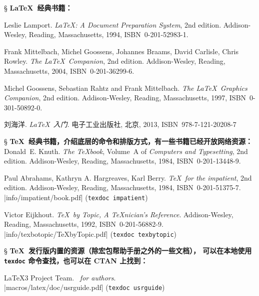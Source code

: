 \begin{thebibliography}{20}

\item[\S] {\bfseries \LaTeX\ 经典书籍：}

 Leslie Lamport. 
  \newblock \emph{\LaTeX: A Document Preparation System}, 2nd edition.
  \newblock Addison-Wesley, Reading, Massachusetts, 1994, ISBN~0-201-52983-1.

 Frank Mittelbach, Michel Goossens, Johannes Braams, David Carlisle, Chris Rowley. 
  \newblock \emph{The \LaTeX\ Companion}, 2nd edition.
  \newblock Addison-Wesley, Reading, Massachusetts, 2004, ISBN~0-201-36299-6.

 Michel Goossens, Sebastian Rahtz and Frank Mittelbach. 
  \newblock \emph{The \LaTeX\ Graphics Companion}, 2nd edition.
  \newblock Addison-Wesley, Reading, Massachusetts, 1997, ISBN~0-301-50892-0.

 刘海洋.
  \newblock \emph{\LaTeX\ 入门}. 
  \newblock 电子工业出版社, 北京, 2013, ISBN~978-7-121-20208-7 

\item[\S] {\bfseries \TeX\ 经典书籍，介绍底层的命令和排版方式，有一些书籍已经开放网络资源：}
 Donald~E. Knuth. 
  \newblock \emph{The \TeX book}, Volume~A of \textit{Computers and Typesetting}, 2nd edition.
  \newblock Addison-Wesley, Reading, Massachusetts, 1984, ISBN~0-201-13448-9.

 Paul Abrahams, Kathryn A. Hargreaves, Karl Berry.
  \newblock \emph{\TeX\ for the impatient}, 2nd edition.
  \newblock Addison-Wesley, Reading, Massachusetts, 1984, ISBN~0-201-51375-7. \\
  \CTAN|info/impatient/book.pdf| (\texttt{texdoc impatient})

 Victor Eijkhout. 
  \newblock \emph{\TeX\ by Topic, A \TeX nician's Reference}.
  \newblock Addison-Wesley, Reading, Massachusetts, 1992, ISBN~0-201-56882-9. \\
  \CTAN|info/texbotopic/TeXbyTopic.pdf| (\texttt{texdoc texbytopic})

\item[\S] {\bfseries \TeX\ 发行版内置的资源（除宏包帮助手册之外的一些文档），
  可以在本地使用 \texttt{texdoc} 命令查找，也可以在 CTAN 上找到：}

 \LaTeX3 Project Team.
  \newblock \emph{\LaTeXe\ for authors}.\\
  \CTAN|macros/latex/doc/usrguide.pdf| (\texttt{texdoc usrguide})


\end{thebibliography}
